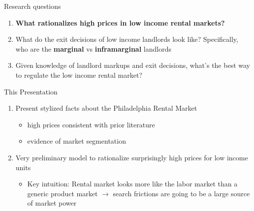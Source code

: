 \documentclass[10pt, xcolor=dvipsnames]{beamer}
\begin{document}
\begin{frame}{Research questions}

\begin{enumerate}
    \item \textbf{What rationalizes high prices in low income rental markets?}
    \pause
    \item What do the exit decisions of low income landlords look like? Specifically, who are the \textbf{marginal} vs \textbf{inframarginal} landlords
    \pause
    \item Given knowledge of landlord markups and exit decisions, what's the best way to regulate the low income rental market?
\end{enumerate}

\end{frame}

\begin{frame}{This Presentation}
    \begin{enumerate}
        \item Present stylized facts about the Philadelphia Rental Market
        \begin{itemize}
            \item high prices consistent with prior literature
            \item evidence of market segmentation
        \end{itemize}
         \pause
        \item Very preliminary model to rationalize surprisingly high prices for low income units
        \pause
        \begin{itemize}
            \item Key intuition: Rental market looks more like the labor market than a generic product market $\rightarrow$ search frictions are going to be a large source of market power
        \end{itemize}
    \end{enumerate}
    
\end{frame}


    
\end{document}
